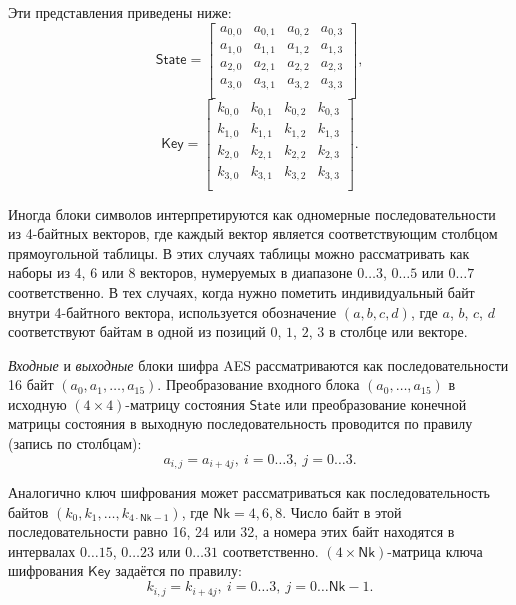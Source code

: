 Эти представления приведены ниже:
\[
    \mathsf{State} = \left[ \begin{array}{cccc}
        a_{0,0} & a_{0,1} & a_{0,2} & a_{0,3} \\
        a_{1,0} & a_{1,1} & a_{1,2} & a_{1,3} \\
        a_{2,0} & a_{2,1} & a_{2,2} & a_{2,3} \\
        a_{3,0} & a_{3,1} &a_{3,2} & a_{3,3}  \\
    \end{array} \right],
\] \[
    \mathsf{Key} = \left[ \begin{array}{cccc}
        k_{0,0} & k_{0,1} & k_{0,2} & k_{0,3} \\
        k_{1,0} & k_{1,1} & k_{1,2} & k_{1,3} \\
        k_{2,0} & k_{2,1} & k_{2,2} & k_{2,3} \\
        k_{3,0} & k_{3,1} & k_{3,2} & k_{3,3} \\
    \end{array} \right].
\]

Иногда блоки символов интерпретируются как одномерные последовательности из 4-байтных векторов, где каждый вектор является соответствующим столбцом прямоугольной таблицы. В этих случаях таблицы можно рассматривать как наборы из 4, 6 или 8 векторов, нумеруемых в диапазоне $0 \dots 3$, $0 \dots 5$ или $0 \dots 7$ соответственно. В тех случаях, когда нужно пометить индивидуальный байт внутри 4-байтного вектора, используется обозначение $(a, b, c, d)$, где $a$, $b$, $c$, $d$ соответствуют байтам в одной из позиций $0$, $1$, $2$, $3$ в столбце или векторе.

\emph{Входные} и \emph{выходные} блоки шифра AES рассматриваются как последовательности 16 байт $(a_0, a_1, \dots, a_{15})$. Преобразование входного блока $(a_0, \dots, a_{15})$ в исходную $(4 \times 4)$-матрицу состояния $\mathsf{State}$ или преобразование конечной матрицы состояния в выходную последовательность проводится по правилу (запись по столбцам):
    \[ a_{i,j} = a_{i + 4j}, ~ i = 0 \dots 3, ~ j = 0 \dots 3. \]

Аналогично ключ шифрования может рассматриваться как последовательность байтов $(k_0, k_1, \dots, k_{4 \cdot \mathsf{Nk} - 1})$, где $\mathsf{Nk} = 4, 6, 8$. Число байт в этой последовательности равно 16, 24 или 32, а номера этих байт находятся в интервалах $0 \dots 15$, $0 \dots 23$ или $0 \dots 31$ соответственно. $(4 \times \mathsf{Nk})$-матрица ключа шифрования $\mathsf{Key}$ задаётся по правилу:
    \[ k_{i,j} = k_{i + 4j}, ~ i = 0 \dots 3, ~ j = 0 \dots \mathsf{Nk} - 1. \]

